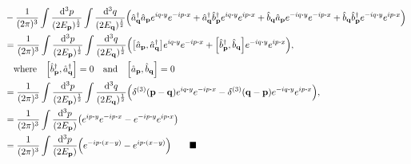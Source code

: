 \documentclass{article}
\begin{document}
\begin{align*}
                                                & -\frac{1}{(2\pi)^3}\int\frac{\dd[3]{p}}{(2E_{\vb{p}})^{\frac{1}{2}}}\int   \frac{\dd[3]{q}}{(2E_{\vb{q}})^{\frac{1}{2}}}     \pqty{\hat{a}^\dagger_{\vb{q}}\hat{a}_{\vb{p}}e^{iq\vdot y}e^{-ip\vdot x}+\hat{a}^\dagger_{\vb{q}}\hat{b}^\dagger_{\vb{p}}e^{iq\vdot y}e^{ip\vdot x}+\hat{b}_{\vb{q}}\hat{a}_{\vb{p}}e^{-iq\vdot y}e^{-ip\vdot x}+\hat{b}_{\vb{q}}\hat{b}^\dagger_{\vb{p}}e^{-iq\vdot y}e^{ip\vdot x}} \\
                                                & =\frac{1}{(2\pi)^3}\int\frac{\dd[3]{p}}{(2E_{\vb{p}})^{\frac{1}{2}}}\int   \frac{\dd[3]{q}}{(2E_{\vb{q}})^{\frac{1}{2}}}     \pqty{\bqty{\hat{a}_{\vb{p}},\hat{a}^\dagger_{\vb{q}}}e^{iq\vdot y}e^{-ip\vdot x}+\bqty{\hat{b}^\dagger_{\vb{p}},\hat{b}_{\vb{q}}}e^{-iq\vdot y}e^{ip\vdot x}}\qcomma                                                                                                                  \\
                                                & \qq{where}\bqty{\hat{b}^\dagger_{\vb{p}},\hat{a}^\dagger_{\vb{q}}}=0\qand\bqty{\hat{a}_{\vb{p}},\hat{b}_{\vb{q}}}=0                                                                                                                                                                                                                                                                                                 \\
                                                & =\frac{1}{(2\pi)^3}\int\frac{\dd[3]{p}}{(2E_{\vb{p}})^{\frac{1}{2}}}\int   \frac{\dd[3]{q}}{(2E_{\vb{q}})^{\frac{1}{2}}}     \pqty{\delta^{(3)}(\vb{p}-\vb{q})e^{iq\vdot y}e^{-ip\vdot x}-\delta^{(3)}(\vb{q}-\vb{p})e^{-iq\vdot y}e^{ip\vdot x}}\qcomma                                                                                                                                                            \\
                                                & =\frac{1}{(2\pi)^3}\int\frac{\dd[3]{p}}{(2E_{\vb{p}})}    \pqty{e^{ip\vdot y}e^{-ip\vdot x}-e^{-ip\vdot y}e^{ip\vdot x}}                                                                                                                                                                                                                                                                                            \\
                                                & =\frac{1}{(2\pi)^3}\int\frac{\dd[3]{p}}{(2E_{\vb{p}})}    \pqty{e^{-ip\vdot(x-y)}-e^{ip\vdot(x-y) }}  \qquad\blacksquare                                                                                                                                                                                                                                                                                            \\
\end{align*}
\end{document}
